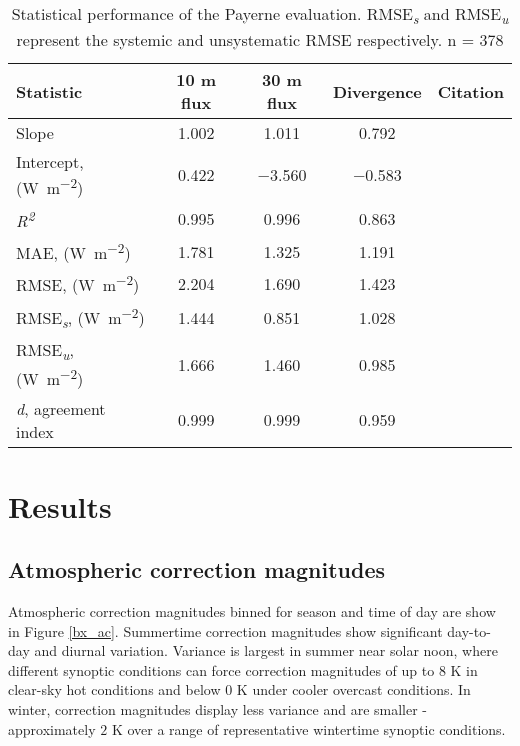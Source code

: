 \begin{bibunit}
\begin{table}[H]
	\centering
	\caption{Statistical performance of the Payerne evaluation. RMSE\textit{\textsubscript{s}} and RMSE\textit{\textsubscript{u}} represent the systemic and unsystematic RMSE respectively. n = 378}
	\label{evalstats}
	\begin{tabular*}{\textwidth}{l@{\extracolsep{\fill}} cccr}
		\toprule 
		Statistic & 10 \si{\meter} flux & 30 \si{\meter} flux & Divergence & Citation \\  \midrule
		Slope & 1.002 & 1.011 & 0.792 &  \\ 
		Intercept, (\si{\watt\per\meter\squared}) & 0.422 & $-$3.560 & $-$0.583 &   \\ 
		\textit{R\textsuperscript{2}} & 0.995 & 0.996 & 0.863 & \\ 
		MAE,  (\si{\watt\per\meter\squared}) & 1.781 & 1.325 & 1.191 & \citep{Willmott1985a} \\ 
		RMSE,  (\si{\watt\per\meter\squared}) & 2.204 & 1.690 & 1.423 & \citep{Willmott1985a} \\ 
		RMSE\textit{\textsubscript{s}},  (\si{\watt\per\meter\squared}) & 1.444 & 0.851 & 1.028 & \citep{Willmott1985a} \\ 
		RMSE\textit{\textsubscript{u}},  (\si{\watt\per\meter\squared}) & 1.666 & 1.460 & 0.985 & \citep{Willmott1985a} \\ 
		\textit{d}, agreement index & 0.999 & 0.999 & 0.959 & \citep{Willmott2012} \\
		\bottomrule
	\end{tabular*} 
\end{table}

\section{Results}

\subsection{Atmospheric correction magnitudes}

Atmospheric correction magnitudes binned for season and time of day are show in Figure \ref{bx_ac}. Summertime correction magnitudes show significant day-to-day and diurnal variation. Variance is largest in summer near solar noon, where different synoptic conditions can force correction magnitudes of up to $8$ \si{\kelvin} in clear-sky hot conditions and below $0$ \si{\kelvin} under cooler overcast conditions. In winter, correction magnitudes display less variance and are smaller - approximately $2$ \si{\kelvin} over a range of representative wintertime synoptic conditions. 


\end{bibunit}

